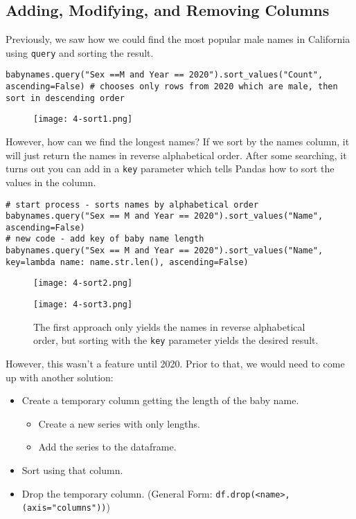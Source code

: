 
\subsection{Adding, Modifying, and Removing Columns}
Previously, we saw how we could find the most popular male names in California using \texttt{query} and sorting the result.

\begin{verbatim}
babynames.query("Sex ==M and Year == 2020").sort_values("Count", ascending=False) # chooses only rows from 2020 which are male, then sort in descending order
\end{verbatim}

\begin{figure}[ht]
\texttt{[image: 4-sort1.png]}\centering
\end{figure}

However, how can we find the longest names? If we sort by the names column, it will just return the names in reverse alphabetical order. After some searching, it turns out you can add in a \texttt{key} parameter which tells Pandas how to sort the values in the column.

\begin{verbatim}
# start process - sorts names by alphabetical order
babynames.query("Sex == M and Year == 2020").sort_values("Name", ascending=False)
# new code - add key of baby name length
babynames.query("Sex == M and Year == 2020").sort_values("Name", key=lambda name: name.str.len(), ascending=False)
\end{verbatim}

\begin{figure}[ht]
\begin{minipage}{0.5\textwidth}
\texttt{[image: 4-sort2.png]}\centering
\end{minipage}
\begin{minipage}{0.5\textwidth}
\texttt{[image: 4-sort3.png]}\centering
\end{minipage}
\caption{The first approach only yields the names in reverse alphabetical order, but sorting with the \texttt{key} parameter yields the desired result.}
\end{figure}

However, this wasn't a feature until 2020. Prior to that, we would need to come up with another solution: 
\begin{itemize}
\item Create a temporary column getting the length of the baby name.
\begin{itemize}
\item Create a new series with only lengths.
\item Add the series to the dataframe.
\end{itemize}
\item Sort using that column.
\item Drop the temporary column. (General Form: \texttt{df.drop(<name>, (axis="columns"))})
\end{itemize}

